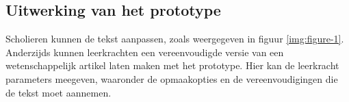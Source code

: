 \documentclass[a0,portrait]{hogent-poster}
\begin{document}
\begin{multicols}{2}
\section{Uitwerking van het prototype}





Scholieren kunnen de tekst aanpassen, zoals weergegeven in figuur \ref{img:figure-1}. Anderzijds kunnen leerkrachten een vereenvoudigde versie van een wetenschappelijk artikel laten maken met het prototype. Hier kan de leerkracht parameters meegeven, waaronder de opmaakopties en de vereenvoudigingen die de tekst moet aannemen.


\end{multicols}
\end{document}
